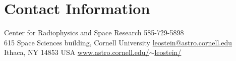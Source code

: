 \section{\sc Contact Information}
Center for Radiophysics and Space Research            \hfill 585-729-5898 \\
615 Space Sciences building, Cornell University   \hfill \href{mailto:leostein@astro.cornell.edu}{leostein@astro.cornell.edu}\\
Ithaca, NY 14853 USA \hfill \href{http://www.astro.cornell.edu/~leostein/}{www.astro.cornell.edu/$\sim$leostein/}

